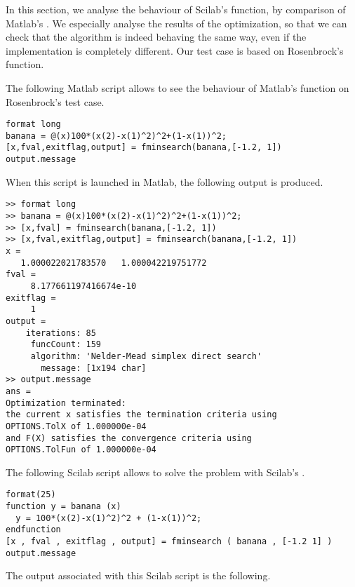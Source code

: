 In this section, we analyse the behaviour of Scilab's 
function, by comparison of Matlab's . We especially analyse 
the results of the optimization, so that we can check that the algorithm
is indeed behaving the same way, even if the implementation is completely 
different. Our test case is based on Rosenbrock's function.

The following Matlab script allows to see the behaviour of Matlab's 
function on Rosenbrock's test case.

\lstset{language=scilabscript}
\begin{lstlisting}
format long
banana = @(x)100*(x(2)-x(1)^2)^2+(1-x(1))^2;
[x,fval,exitflag,output] = fminsearch(banana,[-1.2, 1])
output.message
\end{lstlisting}

When this script is launched in Matlab, the following output is 
produced.

\lstset{language=scilabscript}
\begin{lstlisting}
>> format long
>> banana = @(x)100*(x(2)-x(1)^2)^2+(1-x(1))^2;
>> [x,fval] = fminsearch(banana,[-1.2, 1])
>> [x,fval,exitflag,output] = fminsearch(banana,[-1.2, 1])
x =
   1.000022021783570   1.000042219751772
fval =
     8.177661197416674e-10
exitflag =
     1
output =
    iterations: 85
     funcCount: 159
     algorithm: 'Nelder-Mead simplex direct search'
       message: [1x194 char]
>> output.message
ans =
Optimization terminated:
the current x satisfies the termination criteria using
OPTIONS.TolX of 1.000000e-04
and F(X) satisfies the convergence criteria using
OPTIONS.TolFun of 1.000000e-04
\end{lstlisting}

The following Scilab script allows to solve the problem with Scilab's 
.

\lstset{language=scilabscript}
\begin{lstlisting}
format(25)
function y = banana (x)
  y = 100*(x(2)-x(1)^2)^2 + (1-x(1))^2;
endfunction
[x , fval , exitflag , output] = fminsearch ( banana , [-1.2 1] )
output.message
\end{lstlisting}

The output associated with this Scilab script is the following.

